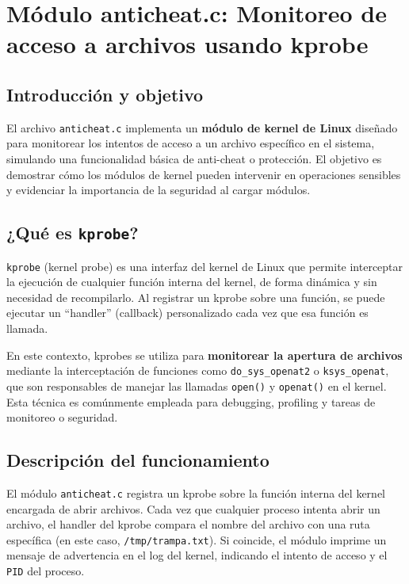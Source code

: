 \section{Módulo anticheat.c: Monitoreo de acceso a archivos usando kprobe}

\subsection{Introducción y objetivo}

El archivo \texttt{anticheat.c} implementa un \textbf{módulo de kernel de Linux} diseñado para monitorear los intentos de acceso a un archivo específico en el sistema, simulando una funcionalidad básica de anti-cheat o protección. El objetivo es demostrar cómo los módulos de kernel pueden intervenir en operaciones sensibles y evidenciar la importancia de la seguridad al cargar módulos.

\subsection{¿Qué es \texttt{kprobe}?}

\texttt{kprobe} (kernel probe) es una interfaz del kernel de Linux que permite interceptar la ejecución de cualquier función interna del kernel, de forma dinámica y sin necesidad de recompilarlo. Al registrar un kprobe sobre una función, se puede ejecutar un ``handler'' (callback) personalizado cada vez que esa función es llamada.

En este contexto, kprobes se utiliza para \textbf{monitorear la apertura de archivos} mediante la interceptación de funciones como \texttt{do\_sys\_openat2} o \texttt{ksys\_openat}, que son responsables de manejar las llamadas \texttt{open()} y \texttt{openat()} en el kernel. Esta técnica es comúnmente empleada para debugging, profiling y tareas de monitoreo o seguridad.

\subsection{Descripción del funcionamiento}

El módulo \texttt{anticheat.c} registra un kprobe sobre la función interna del kernel encargada de abrir archivos. Cada vez que cualquier proceso intenta abrir un archivo, el handler del kprobe compara el nombre del archivo con una ruta específica (en este caso, \texttt{/tmp/trampa.txt}). Si coincide, el módulo imprime un mensaje de advertencia en el log del kernel, indicando el intento de acceso y el \texttt{PID} del proceso.

